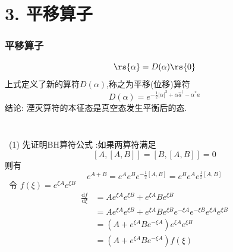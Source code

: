 \section{3. 平移算子}

\begin{frame}
      \frametitle{平移算子}
      \[ \rs{\alpha} =  D(\alpha)  \rs{0} \]
      上式定义了新的算符$D(\alpha)$,称之为平移(位移)算符
      \[D(\alpha)= e^{-\frac{1}{2}\left|\alpha\right|^2 + \alpha \hat{a}^\dagger -\alpha^{*} a}\]
      结论: 湮灭算符的本征态是真空态发生平衡后的态. \\ 
\end{frame}
    

\begin{frame}[allowframebreaks=] 
    \frametitle{}      
    ~\\
    \例 [2. 试证明位平移符可写成 ]{ \[ D(\alpha)=\exp \left(\alpha a^{\dagger}-\alpha^{*} a\right) \]}
    \解 ~(1) 先证明BH算符公式 :如果两算符满足
        \[[A,[A,B]] = [B, [A,B]]=0\]
        则有 
        \[e^{A+B}= e^A e^B e^{-\frac{1}{2}[A,B]} =  e^B e^A e^{\frac{1}{2}[A,B]}\]  
    \证~令 $ f(\xi) = e^{\xi A} e^{\xi B}$ 
       \[ \begin{aligned}
           \frac{\mathrm{d}f}{\mathrm{d}\xi} &=Ae^{\xi A} e^{\xi B} + e^{\xi A} Be^{\xi B} \\
           &= Ae^{\xi A} e^{\xi B} + e^{\xi A} Be^{\xi B} e^{-\xi A} e^{-\xi B} e^{\xi A} e^{\xi B} \\
           &= (A+e^{\xi A} Be^{-\xi A})e^{\xi A} e^{\xi B} \\ 
           &= (A+e^{\xi A} Be^{-\xi A}) f(\xi)
       \end{aligned}\] 
             

\end{frame}
